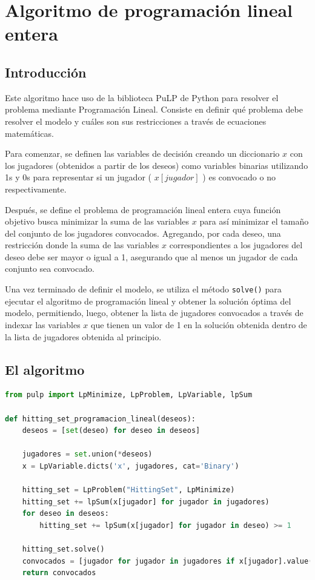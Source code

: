 \documentclass{estilo}
\begin{document}
\newpage
\section{Algoritmo de programación lineal entera}

\subsection{Introducción}

Este algoritmo hace uso de la biblioteca PuLP de Python para resolver el problema mediante Programación Lineal. Consiste en definir qué problema debe resolver el modelo y cuáles son sus restricciones a través de ecuaciones matemáticas.

Para comenzar, se definen las variables de decisión creando un diccionario $x$ con los jugadores (obtenidos a partir de los deseos) como variables binarias utilizando 1s y 0s para representar si un jugador ( $x[jugador]$ ) es convocado o no respectivamente.

Después, se define el problema de programación lineal entera cuya función objetivo busca minimizar la suma de las variables $x$ para así minimizar el tamaño del conjunto de los jugadores convocados. Agregando, por cada deseo, una restricción donde la suma de las variables $x$ correspondientes a los jugadores del deseo debe ser mayor o igual a 1, asegurando que al menos un jugador de cada conjunto sea convocado.

Una vez terminado de definir el modelo, se utiliza el método \texttt{solve()} para ejecutar el algoritmo de programación lineal y obtener la solución óptima del modelo, permitiendo, luego, obtener la lista de jugadores convocados a través de indexar las variables $x$ que tienen un valor de 1 en la solución obtenida dentro de la lista de jugadores obtenida al principio.


\subsection{El algoritmo}

\begin{lstlisting}[language=Python]
from pulp import LpMinimize, LpProblem, LpVariable, lpSum

def hitting_set_programacion_lineal(deseos):
    deseos = [set(deseo) for deseo in deseos]

    jugadores = set.union(*deseos)
    x = LpVariable.dicts('x', jugadores, cat='Binary')
    
    hitting_set = LpProblem("HittingSet", LpMinimize)
    hitting_set += lpSum(x[jugador] for jugador in jugadores)
    for deseo in deseos:
        hitting_set += lpSum(x[jugador] for jugador in deseo) >= 1

    hitting_set.solve()
    convocados = [jugador for jugador in jugadores if x[jugador].value() == 1]
    return convocados
\end{lstlisting}
\end{document}
